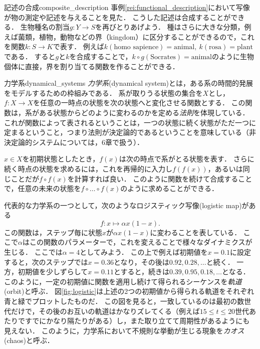 \documentclass[dvipdfmx, 11pt,a4paper]{jsarticle}
\begin{document}
\begin{rei}{記述の合成}{composite_description}
 事例\ref{rei:functional_description}において写像が物の測定や記述を与えることを見た．
 こうした記述は合成することができる．
 生物種名の割当$g:Y \to S$を再びとりあげよう．
 種はさらに大きな分類，例えば菌類，植物，動物などの界（kingdom）に区分することができるので，これを関数$k:S \to K$で表す．
 例えば$k(\text{homo sapience}) = \text{animal}, \ k(\text{rosa}) = \text{plant}$である．
 すると$g$と$k$を合成することで，$k \circ g(\text{Socrates}) = \text{animal}$のように生物個体に直接，界を割り当てる関数を作ることができる．
\end{rei}

\begin{rei}{力学系}{dynamical_systems}
      \emph{力学系}(dynamical system)とは，ある系の時間的発展をモデルするための枠組みである．
      系が取りうる状態の集合を$X$とし，$f:X \to X$を任意の一時点の状態を次の状態へと変化させる関数とする．
      この関数は，系がある状態からどのように変わるのかを定める\emph{法則}を体現している．
      これが関数によって表されるということは，一つの状態に続く状態がただ一つに定まるということ，つまり法則が決定論的であるということを意味している（非決定論的システムについては，6章で扱う）．

      $x\in X$を初期状態としたとき，$f(x)$は次の時点で系がとる状態を表す．
      さらに続く時点の状態を求めるには，これを再帰的に入力し$f(f(x))$，あるいは同じことだが$f \circ f(x)$を計算すれば良い．
      このように関数を続けて合成することで，任意の未来の状態を$f \circ \dots \circ f(x)$のように求めることができる．

      代表的な力学系の一つとして，次のようなロジスティック写像(logistic map)がある
      \[ f: x \mapsto \alpha x (1-x). \]
      この関数は，ステップ毎に状態$x$が$\alpha x (1-x)$に変わることを表している．
      ここで$\alpha$はこの関数のパラメーターで，これを変えることで様々なダイナミクスが生じる．
      ここでは$\alpha=4$としてみよう．
      この上で例えば初期値を$x=0.1$に設定すると，次のステップでは$x=0.36$となり，その後は$0.92, 0.28, \dots$と続く．
      一方，初期値を少しずらして$x=0.11$とすると，続きは$0.39, 0.95, 0.18, \dots$となる．
      このように，一定の初期値に関数を適用し続けて得られるシーケンスを\emph{軌道}(orbit)と呼ぶ．
      図\ref{fig:logistic}は上述の2つの初期値から得られる軌道をそれぞれ青と緑でプロットしたものだ．
      この図を見ると，一致しているのは最初の数世代だけで，その後のお互いの軌道はかなりズレてくる（例えば$15 \leq t \leq 20$世代あたりですでにかなり隔たりがある）し，また取り立てて周期性があるようにも見えない．
      このように，力学系において不規則な挙動が生じる現象を\emph{カオス}(chaos)と呼ぶ．
\end{rei}
\end{document}
